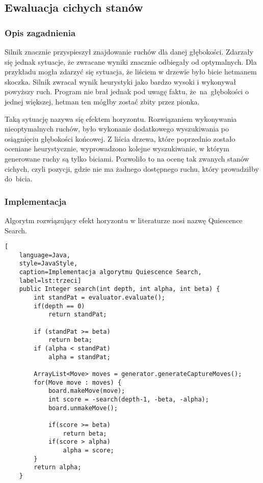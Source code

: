 \subsection{Ewaluacja cichych stanów}
\label{subsec:ewaluacja-cichych-stanow}

\subsubsection{Opis zagadnienia}
Silnik znacznie przyspieszył znajdowanie ruchów dla danej głębokości.
Zdarzały się jednak sytuacje, że zwracane wyniki znacznie odbiegały od optymalnych.
Dla przykładu mogła zdarzyć się sytuacja, że liściem w drzewie było bicie hetmanem skoczka.
Silnik zwracał wynik heurystyki jako bardzo wysoki i wykonywał powyższy ruch.
Program nie brał jednak pod uwagę faktu, że~na~głębokości o jednej większej, hetman ten mógłby zostać zbity przez pionka.

Taką sytuację nazywa się efektem horyzontu.
Rozwiązaniem wykonywania nieoptymalnych ruchów, było wykonanie dodatkowego wyszukiwania po osiągnięciu głębokości końcowej.
Z liścia drzewa, które poprzednio zostało oceniane heurystycznie, wyprowadzono kolejne wyszukiwanie, w którym generowane ruchy są tylko biciami.
Pozwoliło to na ocenę tak zwanych stanów cichych, czyli pozycji, gdzie nie ma żadnego dostępnego ruchu, który prowadziłby do~bicia.

\subsubsection{Implementacja}

Algorytm rozwiązujący efekt horyzontu w literaturze nosi nazwę Quiescence Search.

\begin{lstlisting}[
    language=Java,
    style=JavaStyle,
    caption=Implementacja algorytmu Quiescence Search,
    label=lst:trzeci]
    public Integer search(int depth, int alpha, int beta) {
        int standPat = evaluator.evaluate();
        if(depth == 0)
            return standPat;

        if (standPat >= beta)
            return beta;
        if (alpha < standPat)
            alpha = standPat;

        ArrayList<Move> moves = generator.generateCaptureMoves();
        for(Move move : moves) {
            board.makeMove(move);
            int score = -search(depth-1, -beta, -alpha);
            board.unmakeMove();

            if(score >= beta)
                return beta;
            if(score > alpha)
                alpha = score;
        }
        return alpha;
    }
\end{lstlisting}

